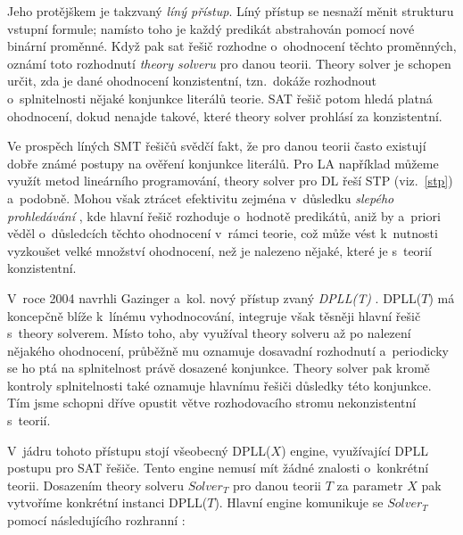 Jeho protějškem je takzvaný \emph{líný přístup}. Líný přístup se nesnaží měnit strukturu vstupní formule; namísto toho je každý predikát abstrahován pomocí nové binární proměnné. Když pak sat řešič rozhodne o~ohodnocení těchto proměnných, oznámí toto rozhodnutí \emph{theory solveru} pro danou teorii. Theory solver je schopen určit, zda je dané ohodnocení konzistentní, tzn.~dokáže rozhodnout o~splnitelnosti nějaké konjunkce literálů teorie. SAT řešič potom hledá platná ohodnocení, dokud nenajde takové, které theory solver prohlásí za konzistentní.

Ve prospěch líných SMT řešičů svědčí fakt, že pro danou teorii často existují dobře známé postupy na ověření konjunkce literálů. Pro LA například můžeme využít metod lineárního programování, theory solver pro DL řeší STP (viz.~\ref{stp}) a~podobně. Mohou však ztrácet efektivitu zejména v~důsledku \emph{slepého prohledávání} \cite{Moura04}, kde hlavní řešič rozhoduje o~hodnotě predikátů, aniž by a~priori věděl o~důsledcích těchto ohodnocení v~rámci teorie, což může vést k~nutnosti vyzkoušet velké množství ohodnocení, než je nalezeno nějaké, které je s~teorií konzistentní.

V~roce 2004 navrhli Gazinger a~kol. nový přístup zvaný \emph{DPLL(T)} \cite{Gazinger04}. DPLL($T$) má koncepčně blíže k~línému vyhodnocování, integruje však těsněji hlavní řešič s~theory solverem. Místo toho, aby využíval theory solveru až po nalezení nějakého ohodnocení, průběžně mu oznamuje dosavadní rozhodnutí a~periodicky se ho ptá na splnitelnost právě dosazené konjunkce. Theory solver pak kromě kontroly splnitelnosti také oznamuje hlavnímu řešiči důsledky této konjunkce. Tím jsme schopni dříve opustit větve rozhodovacího stromu nekonzistentní s~teorií. 

V~jádru tohoto přístupu stojí všeobecný DPLL($X$) engine, využívající DPLL \cite{Davis60} postupu pro SAT řešiče. Tento engine nemusí mít žádné znalosti o~konkrétní teorii. Dosazením theory solveru $Solver_T$ pro danou teorii $T$ za parametr $X$ pak vytvoříme konkrétní instanci DPLL($T$). Hlavní engine komunikuje se $Solver_T$ pomocí následujícího rozhranní \cite{Gazinger04}:

